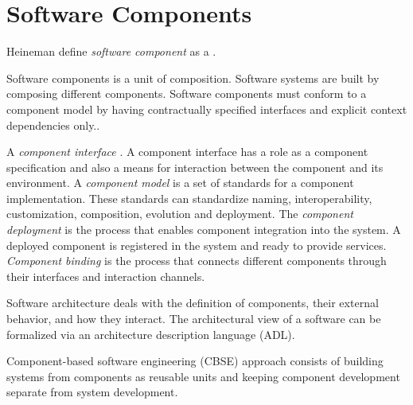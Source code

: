 \section{Software Components}
Heineman define \emph{software component} as a
\cite{heineman_component-based_2001}.

Software components is a unit of composition. Software systems are built by composing different components.  Software components must conform to a component model by having contractually specified interfaces and explicit context dependencies only.\cite{szyperski_component_2002}.

A \emph{component	interface} \cite{crnkovic_software_2011}.
A component interface has a role as a component specification and also a means for interaction between the component and its environment.
A \emph{component model} is a set of standards for a component implementation. These standards can standardize naming, interoperability, customization, composition, evolution and deployment.\cite{heineman_component-based_2001}
The \emph{component deployment} is the process that enables component integration into the system. A deployed component is registered in the system and ready to provide services\cite{crnkovic_software_2011}.
\emph{Component binding} is the process that connects different components through their interfaces and interaction channels.

Software architecture deals with the definition of components, their external behavior, and how they interact\cite{kaur_component_2010}. The architectural view of a software can be formalized via an architecture description language (ADL)\cite{medvidovic_classification_2000}.


Component-based software engineering (CBSE) approach consists of building systems from components as reusable units and keeping component development separate from system development\cite{crnkovic_software_2011}.

